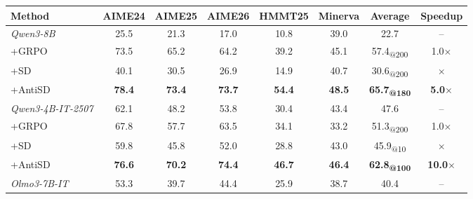 \documentclass{llmxive}
\providecommand{\arraystretch}{0.95}
\begin{document}
\begin{table}[ht]
  \vspace{-0.5em}
  \label{tab:main}
  \centering
  \small
  \setlength{\tabcolsep}{5pt}
  \renewcommand{\arraystretch}{0.95}
  \begin{tabular}{l|c c c c c|c|c}
    \toprule
    Method                             & \textbf{AIME24} & \textbf{AIME25} & \textbf{AIME26} & \textbf{HMMT25} & \textbf{Minerva} & \textbf{Average}                  & \textbf{Speedup}      \\
    \midrule
    \textit{Qwen3-8B}                  & 25.5            & 21.3            & 17.0            & 10.8            & 39.0             & 22.7                              & --                    \\
    \quad +GRPO                        & 73.5            & 65.2            & 64.2            & 39.2            & 45.1             & 57.4\textsubscript{@200}          & 1.0$\times$           \\
    \quad +SD                          & 40.1            & 30.5            & 26.9            & 14.9            & 40.7             & 30.6\textsubscript{@200}          & $\times$              \\
    \rowcolor{antisdrow} \quad +AntiSD & \textbf{78.4}   & \textbf{73.4}   & \textbf{73.7}   & \textbf{54.4}   & \textbf{48.5}    & \textbf{65.7\textsubscript{@180}} & \textbf{5.0$\times$}  \\
    \midrule
    \textit{Qwen3-4B-IT-2507}          & 62.1            & 48.2            & 53.8            & 30.4            & 43.4             & 47.6                              & --                    \\
    \quad +GRPO                        & 67.8            & 57.7            & 63.5            & 34.1            & 33.2             & 51.3\textsubscript{@200}          & 1.0$\times$           \\
    \quad +SD                          & 59.8            & 45.8            & 52.0            & 28.8            & 43.0             & 45.9\textsubscript{@10}           & $\times$              \\
    \rowcolor{antisdrow} \quad +AntiSD & \textbf{76.6}   & \textbf{70.2}   & \textbf{74.4}   & \textbf{46.7}   & \textbf{46.4}    & \textbf{62.8\textsubscript{@100}} & \textbf{10.0$\times$} \\
    \midrule
    \textit{Olmo3-7B-IT}               & 53.3            & 39.7            & 44.4            & 25.9            & 38.7             & 40.4                              & --                    \\

\end{tabular}
\end{table}
\end{document}
